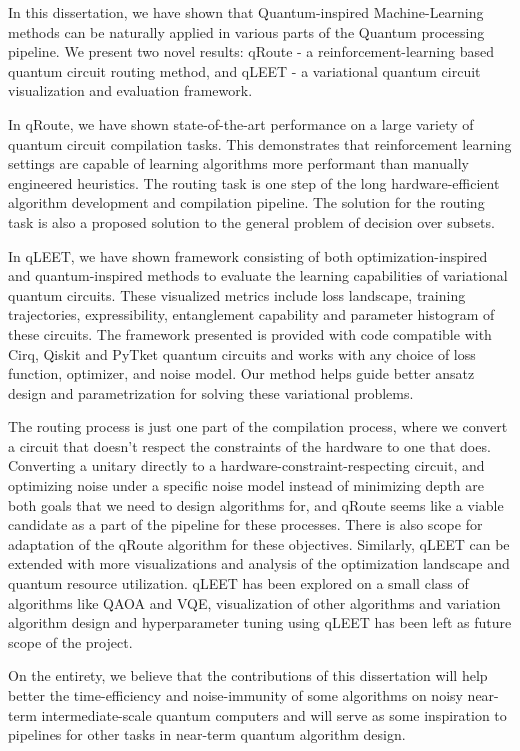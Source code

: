 In this dissertation, we have shown that Quantum-inspired Machine-Learning methods can be naturally applied in various parts of the Quantum processing pipeline. We present two novel results: qRoute - a reinforcement-learning based quantum circuit routing method, and qLEET - a variational quantum circuit visualization and evaluation framework.

In qRoute, we have shown state-of-the-art performance on a large variety of quantum circuit compilation tasks. This demonstrates that reinforcement learning settings are capable of learning algorithms more performant than manually engineered heuristics. The routing task is one step of the long hardware-efficient algorithm development and compilation pipeline. The solution for the routing task is also a proposed solution to the general problem of decision over subsets.

In qLEET, we have shown framework consisting of both optimization-inspired and quantum-inspired methods to evaluate the learning capabilities of variational quantum circuits. These visualized metrics include loss landscape, training trajectories, expressibility, entanglement capability and parameter histogram of these circuits. The framework presented is provided with code compatible with Cirq, Qiskit and PyTket quantum circuits and works with any choice of loss function, optimizer, and noise model. Our method helps guide better ansatz design and parametrization for solving these variational problems.

The routing process is just one part of the compilation process, where we convert a circuit that doesn't respect the constraints of the hardware to one that does. Converting a unitary directly to a hardware-constraint-respecting circuit, and optimizing noise under a specific noise model instead of minimizing depth are both goals that we need to design algorithms for, and qRoute seems like a viable candidate as a part of the pipeline for these processes. There is also scope for adaptation of the qRoute algorithm for these objectives. Similarly, qLEET can be extended with more visualizations and analysis of the optimization landscape and quantum resource utilization. qLEET has been explored on a small class of algorithms like QAOA and VQE, visualization of other algorithms and variation algorithm design and hyperparameter tuning using qLEET has been left as future scope of the project.

On the entirety, we believe that the contributions of this dissertation will help better the time-efficiency and noise-immunity of some algorithms on noisy near-term intermediate-scale quantum computers and will serve as some inspiration to pipelines for other tasks in near-term quantum algorithm design.
